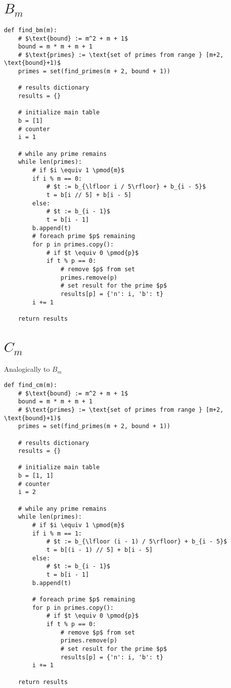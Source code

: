 \documentclass{article}
\begin{document}
\section{$B_m$}

\begin{verbatim}
def find_bm(m):
    # $\text{bound} := m^2 + m + 1$
    bound = m * m + m + 1
    # $\text{primes} := \text{set of primes from range } [m+2, \text{bound}+1)$
    primes = set(find_primes(m + 2, bound + 1))

    # results dictionary
    results = {}

    # initialize main table
    b = [1]
    # counter
    i = 1

    # while any prime remains
    while len(primes):
        # if $i \equiv 1 \pmod{m}$
        if i % m == 0:
            # $t := b_{\lfloor i / 5\rfloor} + b_{i - 5}$
            t = b[i // 5] + b[i - 5]
        else:
            # $t := b_{i - 1}$
            t = b[i - 1]
        b.append(t)
        # foreach prime $p$ remaining
        for p in primes.copy():
            # if $t \equiv 0 \pmod{p}$
            if t % p == 0:
                # remove $p$ from set
                primes.remove(p)
                # set result for the prime $p$
                results[p] = {'n': i, 'b': t}
        i += 1

    return results
\end{verbatim}

\clearpage
\section{$C_m$}

Analogically to $B_m$

\begin{verbatim}
def find_cm(m):
    # $\text{bound} := m^2 + m + 1$
    bound = m * m + m + 1
    # $\text{primes} := \text{set of primes from range } [m+2, \text{bound}+1)$
    primes = set(find_primes(m + 2, bound + 1))

    # results dictionary
    results = {}

    # initialize main table
    b = [1, 1]
    # counter
    i = 2

    # while any prime remains
    while len(primes):
        # if $i \equiv 1 \pmod{m}$
        if i % m == 1:
            # $t := b_{\lfloor (i - 1) / 5\rfloor} + b_{i - 5}$
            t = b[(i - 1) // 5] + b[i - 5]
        else:
            # $t := b_{i - 1}$
            t = b[i - 1]
        b.append(t)

        # foreach prime $p$ remaining
        for p in primes.copy():
            # if $t \equiv 0 \pmod{p}$
            if t % p == 0:
                # remove $p$ from set
                primes.remove(p)
                # set result for the prime $p$
                results[p] = {'n': i, 'b': t}
        i += 1

    return results
\end{verbatim}
\end{document}
